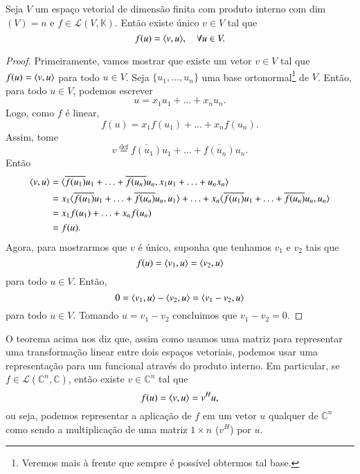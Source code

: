 \begin{teo}\label{teo:riesz}
  Seja $V$ um espaço vetorial de dimensão finita com produto interno com dim$(V)=n$ e $f\in {\mathcal{L}}(V,{\mathbb{K}})$. Então existe único $v\in V$ tal que
  \begin{equation*}
    f(u) = \langle v, u \rangle, \quad \forall u\in V.
  \end{equation*}
\end{teo}
\begin{proof}
Primeiramente, vamos mostrar que existe um vetor $v\in V$ tal que $f(u) = \langle v, u \rangle$ para todo $u\in V$. Seja $\{ u_1,\ldots,u_n\}$ uma base ortonormal\footnote{Veremos mais à frente que sempre é possível obtermos tal base.} de $V$. Então, para todo $u\in V$, podemos escrever
\begin{equation*}
  u = x_1u_1+\ldots+x_nu_n.
\end{equation*}
Logo, como $f$ é linear,
\begin{equation*}
  f(u) = x_1f(u_1)+\ldots+x_nf(u_n).
\end{equation*}
Assim, tome
\begin{equation*}
  v \stackrel{\text{def}}{=} \overline{f(u_1)}u_1+\ldots+\overline{f(u_n)}u_n.
\end{equation*}
Então
\begin{align*}
  \langle v, u \rangle &= \langle \overline{f(u_1)}u_1+\ldots+\overline{f(u_n)}u_n, x_1u_1+\ldots+u_nx_n \rangle\\
  &= x_1\langle \overline{f(u_1)}u_1+\ldots+\overline{f(u_n)}u_n, u_1 \rangle + \ldots + x_n\langle \overline{f(u_1)}u_1+\ldots+\overline{f(u_n)}u_n, u_n \rangle\\
  &= x_1f(u_1) + \ldots + x_nf(u_n)\\
  &= f(u).
\end{align*}
Agora, para mostrarmos que $v$ é único, suponha que tenhamos $v_1$ e $v_2$ tais que
\begin{equation*}
  f(u) = \langle v_1, u \rangle=\langle v_2, u \rangle
\end{equation*}
para todo $u\in V$. Então,
\begin{equation*}
  0 = \langle v_1, u \rangle-\langle v_2, u \rangle=\langle v_1-v_2, u \rangle
\end{equation*}
para todo $u\in V$. Tomando $u=v_1-v_2$ concluimos que $v_1-v_2=0$.
\end{proof}

O teorema acima nos diz que, assim como usamos uma matriz para representar uma transformação linear entre dois espaços vetoriais, podemos usar uma representação para um funcional através do produto interno. Em particular, se $f \in {\mathcal{L}}({\mathbb{C}}^n,{\mathbb{C}})$, então existe $v \in {\mathbb{C}}^n$ tal que
\begin{equation*}
	f(u) = \langle v, u \rangle = v^Hu,
\end{equation*}
ou seja, podemos representar a aplicação de $f$ em um vetor $u$ qualquer de ${\mathbb{C}}^n$ como sendo a multiplicação de uma matriz $1\times n$ ($v^H$) por $u$.

